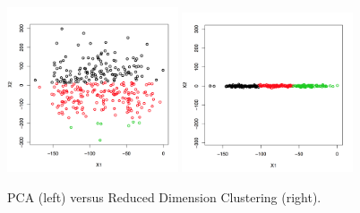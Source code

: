 \documentclass[simplex.tex]{subfiles}
\begin{document}
\begin{figure}[h!]
\begin{cframed}
\centering
\includegraphics[width=0.45\textwidth]{./figs/pcaBased.png}
\includegraphics[width=0.45\textwidth]{./figs/ARC.png}
\caption{PCA (left) versus Reduced Dimension Clustering (right).}
\label{fig:arc}
\end{cframed}
\end{figure}
\end{document}
